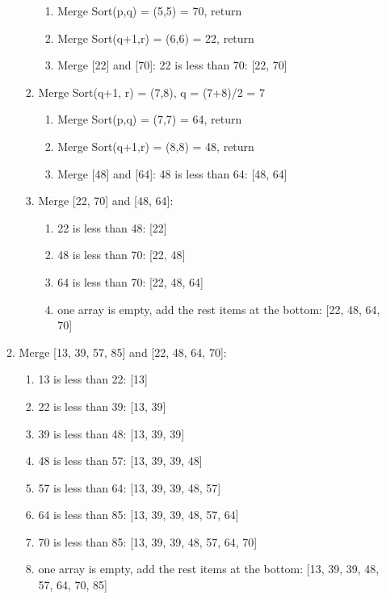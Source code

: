 \documentclass[12pt]{article}
\begin{document}
\begin{enumerate}
\begin{enumerate}
\begin{enumerate}
\begin{enumerate}
                \item Merge Sort(p,q) = (5,5) = 70, return
                \item Merge Sort(q+1,r) = (6,6) = 22, return
                \item Merge [22] and [70]: 22 is less than 70: [22, 70]
            \end{enumerate}
            \item Merge Sort(q+1, r) = (7,8), q = (7+8)/2 = 7 \begin{enumerate}
                \item Merge Sort(p,q) = (7,7) = 64, return
                \item Merge Sort(q+1,r) = (8,8) = 48, return
                \item Merge [48] and [64]: 48 is less than 64: [48, 64]
            \end{enumerate}
            \item Merge [22, 70] and [48, 64]: \begin{enumerate}
                \item 22 is less than 48: [22]
                \item 48 is less than 70: [22, 48]
                \item 64 is less than 70: [22, 48, 64]
                \item one array is empty, add the rest items at the bottom: [22, 48, 64, 70]
            \end{enumerate}
        \end{enumerate}
        \item Merge [13, 39, 57, 85] and [22, 48, 64, 70]: \begin{enumerate}
            \item 13 is less than 22: [13]
            \item 22 is less than 39: [13, 39]
            \item 39 is less than 48: [13, 39, 39]
            \item 48 is less than 57: [13, 39, 39, 48]
            \item 57 is less than 64: [13, 39, 39, 48, 57]
            \item 64 is less than 85: [13, 39, 39, 48, 57, 64]
            \item 70 is less than 85: [13, 39, 39, 48, 57, 64, 70]
            \item one array is empty, add the rest items at the bottom: [13, 39, 39, 48, 57, 64, 70, 85]
        \end{enumerate}
    \end{enumerate}
\end{enumerate}
\end{document}
